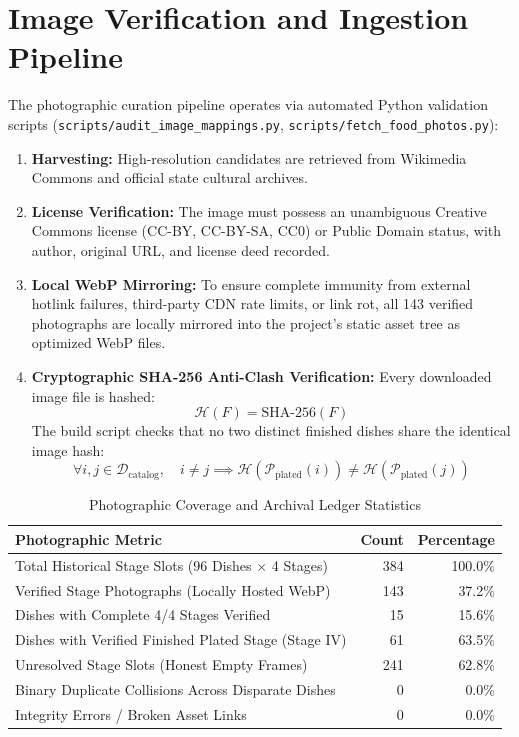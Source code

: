 \documentclass[11pt,a4paper]{report}
\begin{document}
\section{Image Verification and Ingestion Pipeline}
The photographic curation pipeline operates via automated Python validation scripts (\texttt{scripts/audit\_image\_mappings.py}, \texttt{scripts/fetch\_food\_photos.py}):
\begin{enumerate}
    \item \textbf{Harvesting:} High-resolution candidates are retrieved from Wikimedia Commons and official state cultural archives.
    \item \textbf{License Verification:} The image must possess an unambiguous Creative Commons license (CC-BY, CC-BY-SA, CC0) or Public Domain status, with author, original URL, and license deed recorded.
    \item \textbf{Local WebP Mirroring:} To ensure complete immunity from external hotlink failures, third-party CDN rate limits, or link rot, all 143 verified photographs are locally mirrored into the project's static asset tree as optimized WebP files.
    \item \textbf{Cryptographic SHA-256 Anti-Clash Verification:} Every downloaded image file is hashed:
    \begin{equation}
        \mathcal{H}(F) = \text{SHA-256}(F)
    \end{equation}
    The build script checks that no two distinct finished dishes share the identical image hash:
    \begin{equation}
        \forall i, j \in \mathcal{D}_{\text{catalog}}, \quad i \neq j \implies \mathcal{H}(\mathcal{P}_{\text{plated}}(i)) \neq \mathcal{H}(\mathcal{P}_{\text{plated}}(j))
    \end{equation}
\end{enumerate}

\begin{table}[ht]
    \centering
    \caption{Photographic Coverage and Archival Ledger Statistics}
    \label{tab:photo_stats}
    \begin{tabularx}{\textwidth}{lrr}
        \toprule
        \textbf{Photographic Metric} & \textbf{Count} & \textbf{Percentage} \\
        \midrule
        Total Historical Stage Slots (96 Dishes $\times$ 4 Stages) & 384 & 100.0\% \\
        Verified Stage Photographs (Locally Hosted WebP) & 143 & 37.2\% \\
        Dishes with Complete 4/4 Stages Verified & 15 & 15.6\% \\
        Dishes with Verified Finished Plated Stage (Stage IV) & 61 & 63.5\% \\
        Unresolved Stage Slots (Honest Empty Frames) & 241 & 62.8\% \\
        Binary Duplicate Collisions Across Disparate Dishes & 0 & 0.0\% \\
        Integrity Errors / Broken Asset Links & 0 & 0.0\% \\
        \bottomrule
    \end{tabularx}
\end{table}
\end{document}
